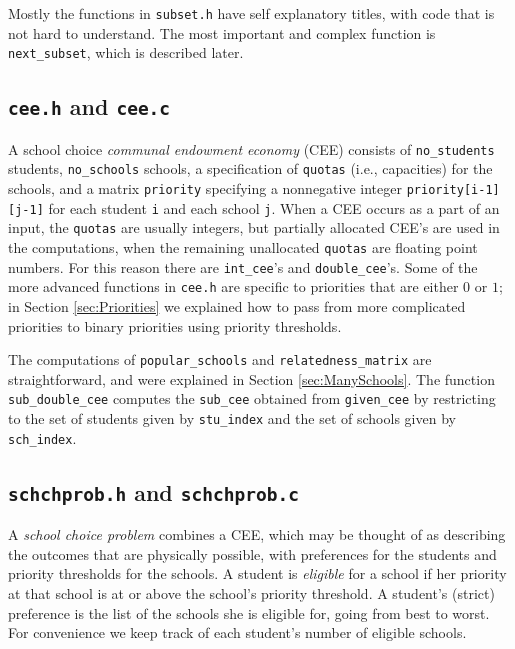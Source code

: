 \documentclass[12pt]{article}
\theoremstyle{definition}
\begin{document}
\begin{appendix}
Mostly the functions in \texttt{subset.h} have self explanatory
titles, with code that is not hard to understand.  The most important
and complex function is \texttt{next\_subset}, which is described
later.

\subsection{\texttt{cee.h} and \texttt{cee.c}}

A school choice \emph{communal endowment economy} (CEE) consists of
\texttt{no\_students} students, \texttt{no\_schools} schools, a
specification of \texttt{quotas} (i.e., capacities) for the schools,
and a matrix \texttt{priority} specifying a nonnegative integer
\texttt{priority[i-1][j-1]} for each student \texttt{i} and each
school \texttt{j}.  When a CEE occurs as a part of an input, the
\texttt{quotas} are usually integers, but partially allocated CEE's
are used in the computations, when the remaining unallocated
\texttt{quotas} are floating point numbers.  For this reason there are
\texttt{int\_cee}'s and \texttt{double\_cee}'s.  Some of the more
advanced functions in \texttt{cee.h} are specific to priorities that
are either $0$ or $1$; in Section \ref{sec:Priorities} we explained
how to pass from more complicated priorities to binary priorities
using priority thresholds.

The computations of \texttt{popular\_schools} and
\texttt{relatedness\_matrix} are straightforward, and were explained
in Section \ref{sec:ManySchools}.  The function
\texttt{sub\_double\_cee} computes the \texttt{sub\_cee} obtained from
\texttt{given\_cee} by restricting to the set of students given by
\texttt{stu\_index} and the set of schools given by
\texttt{sch\_index}.

\subsection{\texttt{schchprob.h} and \texttt{schchprob.c}}

A \emph{school choice problem} combines a CEE, which may be thought of
as describing the outcomes that are physically possible, with
preferences for the students and priority thresholds for the schools.
A student is \emph{eligible} for a school if her priority at that
school is at or above the school's priority threshold. A student's
(strict) preference is the list of the schools she is eligible for,
going from best to worst.  For convenience we keep track of each
student's number of eligible schools.


\end{appendix}
\end{document}
